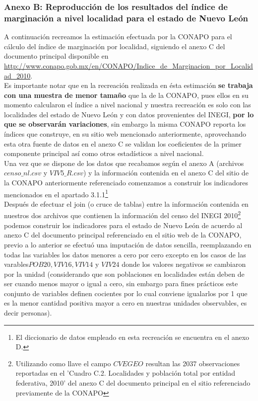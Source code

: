 \documentclass[paper=letter, fontsize=11pt]{scrartcl}
\numberwithin{equation}{section} %
\numberwithin{figure}{section} %
\numberwithin{table}{section} %
\begin{document}
\begin{enumerate}
\begin{enumerate}
\subsubsection{Anexo B: Reproducción de los resultados del índice de marginación a nivel localidad para el estado de Nuevo León}
A continuación recreamos la estimación efectuada por la CONAPO para el cálculo del índice de marginación por localidad, siguiendo el anexo C del documento principal disponible en \url{ http://www.conapo.gob.mx/en/CONAPO/Indice_de_Marginacion_por_Localidad_2010}.\\ 
Es importante notar que en la recreación realizada en ésta estimación \textbf{se trabaja con una muestra de menor tamaño} que la de la CONAPO, pues ellos en su momento calcularon el índice a nivel nacional y nuestra recreación es solo con las localidades del estado de Nuevo León y con datos provenientes del INEGI,\textbf{ por lo que se observarán variaciones}, sin embargo la misma CONAPO reporta los índices que construye, en su sitio web mencionado anteriormente, aprovechando esta otra fuente de datos en el anexo C se validan los coeficientes de la primer componente principal así como otros estadísticos a nivel nacional.\\
Una vez que se dispone de los datos que recabamos según el anexo A (archivos $censo\_nl.csv$ y $VIV5\_R.csv$) y  la información contenida en el anexo C del sitio de la CONAPO anteriormente referenciado comenzamos a construir los indicadores mencionados en el apartado 3.1.1\footnote{El diccionario de datos empleado en esta recreación se encuentra en el anexo D.}\\
Después de efectuar el join (o cruce de tablas) entre la información contenida en nuestros dos archivos que contienen la información del censo del INEGI 2010\footnote{Utilizando como llave el campo $CVEGEO$ resultan las 2037 observaciones reportadas en el 'Cuadro C.2. Localidades y población total por entidad federativa, 2010' del anexo C del documento principal en el sitio referenciado previamente de la CONAPO} podemos construir los indicadores para el estado de Nuevo León de acuerdo al anexo C del documento principal referenciado en el sitio web de la CONAPO, previo a lo anterior se efectuó una imputación de datos sencilla, reemplazando en todas las variables los datos menores a cero por cero excepto en los casos de las varables$POB20, VIV16,VIV14$ y $VIV24$ donde los valores negativos se cambiaron por la unidad (considerando que son poblaciones en localidades están deben de ser cuando menos mayor o igual a cero, sin embargo para fines prácticos este conjunto de variables definen cocientes por lo cual conviene igualarlos por 1 que es la menor cantidad positiva mayor a cero en nuestras unidades observables, es decir personas).\begin{itemize}

\end{itemize}
\end{enumerate}
\end{enumerate}
\end{document}

